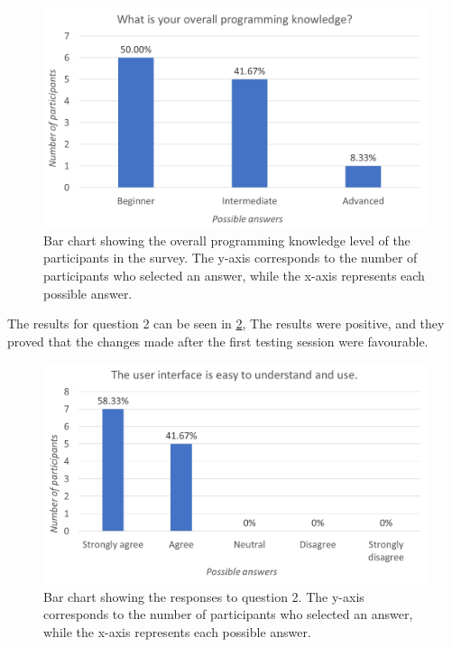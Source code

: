 \documentclass[12pt,a4paper]{article}
\newcommand{\captionstyle}[1] {
    \small{#1}
}
\begin{document}
\begin{figure}[!htb]%
	\centering
	\includegraphics[width=1\columnwidth]{q1}%
	\caption[Bar chart showing the overall programming knowledge level of the participants in the survey.]{\captionstyle{Bar chart showing the overall programming knowledge level of the participants in the survey. The y-axis corresponds to the number of participants who selected an answer, while the x-axis represents each possible answer.}}%
	\label{fig:progknowl}%
\end{figure}


The results for question 2 can be seen in \cref{fig:ui}, The results were positive, and they proved that the changes made after the first testing session were favourable.

\begin{figure}[!htb]%
	\centering
	\includegraphics[width=1\columnwidth]{q2}%
	\caption[Bar chart showing the responses to question 2.]{\captionstyle{Bar chart showing the responses to question 2. The y-axis corresponds to the number of participants who selected an answer, while the x-axis represents each possible answer.}}%
	\label{fig:ui}%
\end{figure}
\end{document}
